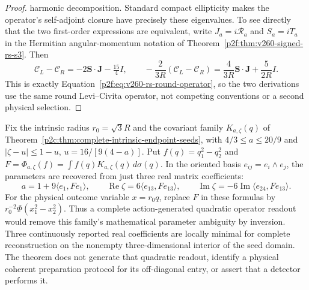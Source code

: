 \documentclass[11pt,a4paper]{article}
\begin{document}
\begin{proof}
harmonic decomposition. Standard compact ellipticity makes the
operator's self-adjoint closure have precisely these eigenvalues.
To see directly that the two first-order expressions are equivalent,
write $J_a=i\mathscr R_a$ and $S_a=iT_a$ in the Hermitian
angular-momentum notation of
Theorem~\ref{p2f:thm:v260-signed-rs-s3}. Then
\[
  \mathcal C_L-\mathcal C_R=-2\mathbf S\cdot\mathbf J-\tfrac{15}{4}I,
  \qquad
  -\frac{2}{3R}(\mathcal C_L-\mathcal C_R)
    =\frac4{3R}\mathbf S\cdot\mathbf J+\frac5{2R}I.
\]
This is exactly Equation~\ref{p2f:eq:v260-rs-round-operator},
so the two derivations use the same round Levi--Civita operator, not
competing conventions or a second physical selection.
\end{proof}

\begin{theorem}
\label{p2f:thm:v260-quadratic-moment-inverse}
Fix the intrinsic radius \(r_0=\sqrt3R\) and the covariant family
\(K_{a,\zeta}(q)\) of
Theorem~\ref{p2c:thm:complete-intrinsic-endpoint-seeds}, with
\(4/3\le a\le20/9\) and
\(|\zeta-u|\le1-u\), \(u=16/[9(4-a)]\).
Put \(f(q)=q_1^2-q_2^2\) and
\(F=\Phi_{a,\zeta}(f)=\int f(q)K_{a,\zeta}(q)\,d\sigma(q)\).
In the oriented basis \(e_{ij}=e_i\wedge e_j\), the parameters are
recovered from just three real matrix coefficients:
\[
 \boxed{a=1+9\langle e_1,Fe_1\rangle,\qquad
 \operatorname{Re}\zeta=6\langle e_{13},Fe_{13}\rangle,\qquad
 \operatorname{Im}\zeta=-6\operatorname{Im}
                  \langle e_{24},Fe_{13}\rangle.}
\]
For the physical outcome variable \(x=r_0q\), replace \(F\) in these
formulas by \(r_0^{-2}\Phi(x_1^2-x_2^2)\). Thus a complete action-generated
quadratic operator readout would remove this family's mathematical
parameter ambiguity by inversion. Three continuously reported real
coefficients are locally minimal for complete reconstruction on the
nonempty three-dimensional interior of the seed domain. The theorem
does not generate that quadratic readout, identify a physical coherent
preparation protocol for its off-diagonal entry, or assert that a
detector performs it.
\end{theorem}
\end{document}
